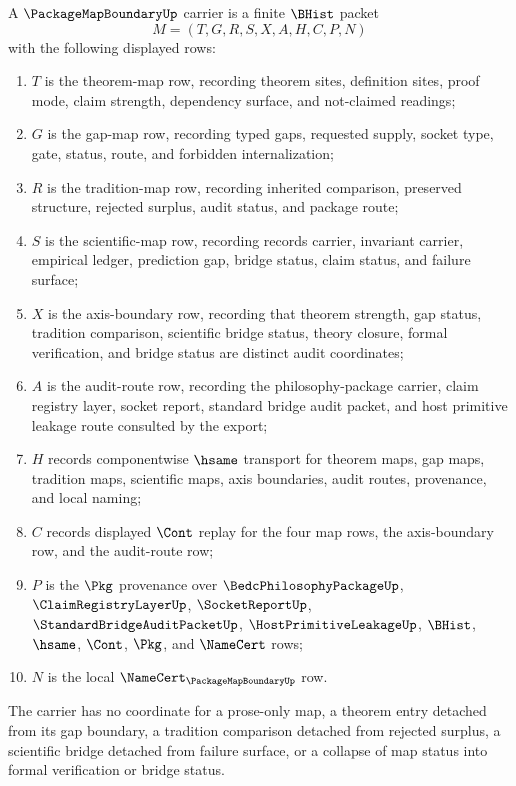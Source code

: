 \begin{definition}
\label{def:package-map-boundary-carrier}
A $\PackageMapBoundaryUp$ carrier is a finite $\BHist$ packet
$$
M=(T,G,R,S,X,A,H,C,P,N)
$$
with the following displayed rows:
\begin{enumerate}
\item $T$ is the theorem-map row, recording theorem sites, definition sites, proof mode, claim strength, dependency surface, and not-claimed readings;
\item $G$ is the gap-map row, recording typed gaps, requested supply, socket type, gate, status, route, and forbidden internalization;
\item $R$ is the tradition-map row, recording inherited comparison, preserved structure, rejected surplus, audit status, and package route;
\item $S$ is the scientific-map row, recording records carrier, invariant carrier, empirical ledger, prediction gap, bridge status, claim status, and failure surface;
\item $X$ is the axis-boundary row, recording that theorem strength, gap status, tradition comparison, scientific bridge status, theory closure, formal verification, and bridge status are distinct audit coordinates;
\item $A$ is the audit-route row, recording the philosophy-package carrier, claim registry layer, socket report, standard bridge audit packet, and host primitive leakage route consulted by the export;
\item $H$ records componentwise $\hsame$ transport for theorem maps, gap maps, tradition maps, scientific maps, axis boundaries, audit routes, provenance, and local naming;
\item $C$ records displayed $\Cont$ replay for the four map rows, the axis-boundary row, and the audit-route row;
\item $P$ is the $\Pkg$ provenance over $\BedcPhilosophyPackageUp$, $\ClaimRegistryLayerUp$, $\SocketReportUp$, $\StandardBridgeAuditPacketUp$, $\HostPrimitiveLeakageUp$, $\BHist$, $\hsame$, $\Cont$, $\Pkg$, and $\NameCert$ rows;
\item $N$ is the local $\NameCert_{\PackageMapBoundaryUp}$ row.
\end{enumerate}
The carrier has no coordinate for a prose-only map, a theorem entry detached from its gap boundary, a tradition comparison detached from rejected surplus, a scientific bridge detached from failure surface, or a collapse of map status into formal verification or bridge status.
\end{definition}

